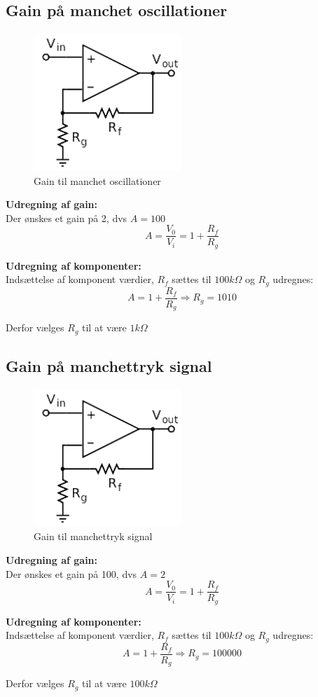 \subsection{Gain på manchet oscillationer }
\begin{figure}[H]
	\centering
	\includegraphics[width = 0.5\textwidth]{Implementeringsdokument/billeder/OpAMP_gain.png}
	\caption{Gain til manchet oscillationer}\label{fig:opam1}
\end{figure}
\textbf{Udregning af gain: } \\
Der ønskes et gain på 2, dvs $A = 100$
\begin{equation}
	A = \frac{V_0}{V_i} = 1 + \frac{R_f}{R_g}
\end{equation}


\textbf{Udregning af komponenter:}\\
Indsættelse af komponent værdier, $R_f$ sættes til $100k\Omega$ og $R_g$ udregnes: 
\begin{equation}
	 A = 1 + \frac{R_f}{R_g} \Rightarrow R_g =  1010
\end{equation}

Derfor vælges $R_g$ til at være $1k\Omega$

\subsection{Gain på manchettryk signal }
\begin{figure}[H]
	\centering
	\includegraphics[width = 0.5\textwidth]{Implementeringsdokument/billeder/OpAMP_gain.png}
	\caption{Gain til manchettryk signal}\label{fig:opam2}
\end{figure}
\textbf{Udregning af gain: } \\
Der ønskes et gain på 100, dvs $A = 2$
\begin{equation}
	A = \frac{V_0}{V_i} = 1 + \frac{R_f}{R_g}
\end{equation}

\textbf{Udregning af komponenter:}\\
Indsættelse af komponent værdier, $R_f$ sættes til $100k\Omega$ og $R_g$ udregnes:
\begin{equation}
	 A = 1 + \frac{R_f}{R_g} \Rightarrow R_g = 100000
\end{equation}

Derfor vælges $R_g$ til at være $100k\Omega$